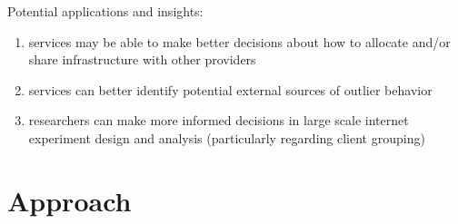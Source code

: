 \documentclass[10pt, sigconf]{acmart}
\begin{document}
Potential applications and insights:
\begin{enumerate}
    \item services may be able to make better decisions about how to allocate
        and/or share infrastructure with other providers
    \item services can better identify potential external sources of outlier behavior
    \item researchers can make more informed decisions in large scale internet
        experiment design and analysis (particularly regarding client grouping)
\end{enumerate}

\section{Approach}
\end{document}
